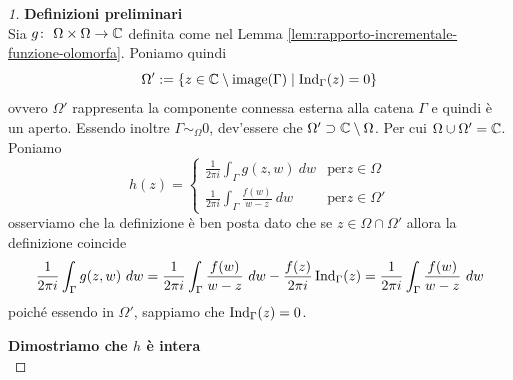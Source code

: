 \begin{proof}[1]

    \textbf{Definizioni preliminari}\\

    Sia $g \colon\ \Omega\times\Omega \rightarrow \mathbb{C}$ definita come nel Lemma
    \ref{lem:rapporto-incrementale-funzione-olomorfa}. 
    Poniamo quindi 
    \begin{equation*}
        \Omega' := \left\{ z \in \mathbb{C} \setminus \operatorname{image}(\Gamma) \mid
            \operatorname{Ind}_\Gamma(z) = 0  \right\}
    \end{equation*}
    ovvero $\Omega'$ rappresenta la componente connessa esterna alla catena
    $\Gamma$ e quindi è un aperto. %
    Essendo inoltre $\Gamma \sim_\Omega 0$, dev'essere che $\Omega' \supset
    \mathbb{C} \setminus \Omega$.  Per cui $\Omega \cup \Omega' = \mathbb{C}$. Poniamo 
    \begin{equation*}
      h(z) = \begin{cases}
        \frac{1}{2\pi i} \int_\Gamma g(z,w)\ dw  & \text{per} z \in \Omega \\
        \frac{1}{2\pi i} \int_\Gamma \frac{f(w)}{w-z}\ dw \ & \text{per}
        z \in \Omega' 
      \end{cases}
    \end{equation*}
    osserviamo che la definizione è ben posta dato che se $z \in \Omega \cap
    \Omega'$ allora la definizione coincide
    \begin{equation*}
      \frac{1}{2\pi i} \int_\Gamma g(z,w)\ dw =  
            \frac{1}{2\pi i} \int_\Gamma \frac{f(w)}{w-z}\ dw - 
            \frac{f(z)}{2\pi i} \operatorname{Ind}_\Gamma(z) 
            = \frac{1}{2\pi i} \int_\Gamma \frac{f(w)}{w-z}\ dw        
    \end{equation*}
    poiché essendo in $\Omega'$, sappiamo che $\operatorname{Ind}_\Gamma(z)
    = 0$. 
    
    \textbf{Dimostriamo che $h$ è intera}\\


\end{proof}
